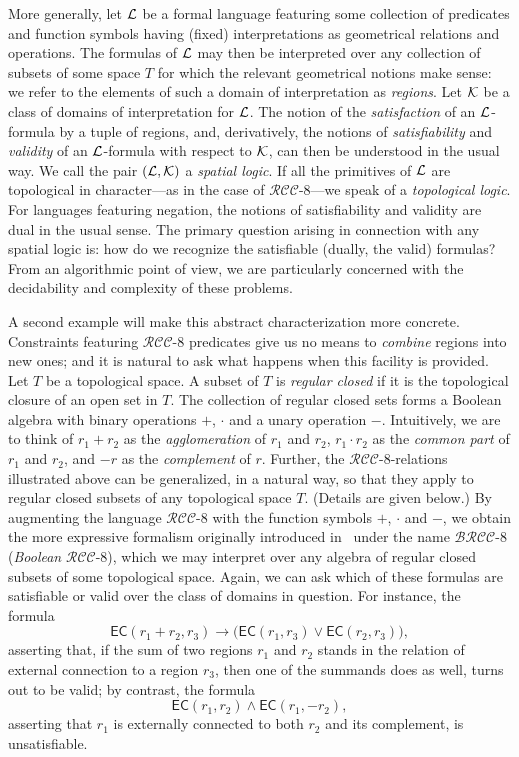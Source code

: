 \documentclass{LMCS}
\theoremstyle{plain}
\newcommand{\BRCCE}{\ensuremath{\mathcal{BRCC}\text{-}8}}
\newcommand{\RCCE}{\ensuremath{\mathcal{RCC}\text{-}8}}\newcommand{\RCCEcc}{\ensuremath{\RCCE{}cc}}\newcommand{\RCCEc}{\ensuremath{\RCCE{}c}}
\begin{document}
More generally, let $\mathcal{L}$ be a formal language featuring some
collection of predicates and function symbols having (fixed)
interpretations as geometrical relations and operations.  The formulas
of $\mathcal{L}$ may then be interpreted over any collection of subsets of
some space $T$ for which the relevant geometrical notions make sense:
we refer to the elements of such a domain of interpretation as \emph{regions}.
Let $\mathcal{K}$ be a class of domains of interpretation for
$\mathcal{L}$. The notion of the \emph{satisfaction} of an $\mathcal{L}$-formula by a
tuple of regions, and, derivatively, the notions of \emph{satisfiability}
and \emph{validity} of an $\mathcal{L}$-formula with respect
to $\mathcal{K}$, can then be understood in the usual way. We call the pair
$(\mathcal{L}, \mathcal{K})$ a \emph{spatial logic}. If all the primitives of $\mathcal{L}$ are
topological in character---as in the case of $\RCCE$---we speak of a
\emph{topological logic}. For languages featuring negation, the notions
of satisfiability and validity are dual in the usual sense.  The
primary question arising in connection with any spatial logic is: how
do we recognize the satisfiable (dually, the valid) formulas? From an
algorithmic point of view, we are particularly concerned with the
decidability and complexity of these problems.

A second example will make this abstract characterization more
concrete.  Constraints featuring $\RCCE$ predicates give us no means
to \emph{combine} regions into new ones; and it is natural to ask what
happens when this facility is provided. Let $T$ be a topological
space.  A subset of $T$ is \emph{regular closed} if it is the
topological closure of an open set in $T$. The collection of regular
closed sets forms a Boolean algebra with binary operations $+$,
$\cdot$ and a unary operation $-$.  Intuitively, we are to think of
$r_1 +r_2$ as the \emph{agglomeration} of $r_1$ and $r_2$, $r_1 \cdot
r_2$ as the \emph{common part} of $r_1$ and $r_2$, and $-r$ as the
\emph{complement} of $r$.  Further, the $\RCCE$-relations illustrated
above can be generalized, in a natural way, so that they apply to
regular closed subsets of any topological space $T$. (Details are
given below.)  By augmenting the language $\RCCE$ with the function
symbols $+$, $\cdot$ and $-$, we obtain the more expressive formalism
originally introduced in~\cite{Wolter&Z00ecai} under the name $\BRCCE$
({\em Boolean} $\RCCE$), which we may interpret over any algebra of
regular closed subsets of some topological space. Again, we can ask
which of these formulas are satisfiable or valid over the class of
domains in question.  For instance, the formula
\begin{equation*}
\mathsf{EC}(r_1+r_2, r_3) \to
\big (\mathsf{EC}(r_1, r_3) \vee \mathsf{EC}(r_2, r_3) \big ),
\end{equation*}
asserting that, if the sum of two regions $r_1$ and $r_2$ stands in the
relation of external connection to a region $r_3$, then one of
the summands does as well, turns out to be valid; by contrast, the formula
\begin{equation*}
\mathsf{EC}(r_1, r_2) \wedge \mathsf{EC}(r_1, -r_2),
\end{equation*}
asserting that $r_1$ is externally connected to both $r_2$ and its
complement, is unsatisfiable.
\end{document}
